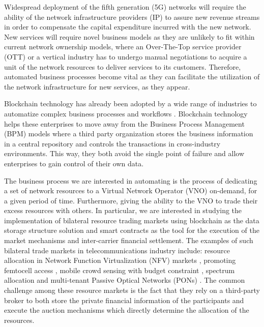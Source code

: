 \documentclass[conference]{IEEEtran}
\begin{document}
Widespread deployment of the fifth generation (5G) networks will require the ability of the network infrastructure providers (IP) to assure new revenue streams in order to compensate the capital expenditure incurred with the new network. New services will require novel business models as they are unlikely to fit within current network ownership models, where an Over-The-Top service provider (OTT) or a vertical industry has to undergo manual negotiations to acquire a unit of the network resources to deliver services to its customers. Therefore, automated business processes become vital as they can facilitate the utilization of the network infrastructure for new services, as they appear.


Blockchain technology has already been adopted by a wide range of industries to automatize complex business processes and workflows \cite{fridgen2018cross,milani2016blockchain}. Blockchain technology helps these enterprises to move away from the Business Process Management (BPM) models where a third party organization stores the business information in a central repository and controls the transactions in cross-industry environments. This way, they both avoid the single point of failure and allow enterprises to gain control of their own data.


The business process we are interested in automating is the process of dedicating a set of network resources to a Virtual Network Operator (VNO) on-demand, for a given period of time. Furthermore, giving the ability to the VNO to trade their excess resources with others. In particular, we are interested in studying the implementation of bilateral resource trading markets using blockchain as the data storage structure solution and smart contracts as the tool for the execution of the market mechanisms and inter-carrier financial settlement. The examples of such bilateral trade markets in telecommunications industry include: resource allocation in Network Function Virtualization (NFV) markets \cite{8542782}, promoting femtocell access \cite{8665886}, mobile crowd sensing with budget constraint \cite{8664672}, spectrum allocation \cite{8395445} and multi-tenant Passive Optical Networks (PONs) \cite{8488596}. The common challenge among these resource markets is the fact that they rely on a third-party broker to both store the private financial information of the participants and execute the auction mechanisms which directly determine the allocation of the resources.
\end{document}
